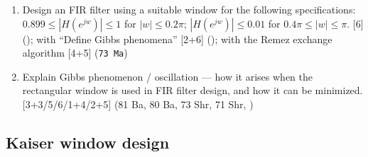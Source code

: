 \documentclass[12pt]{article}
\begin{document}
\begin{enumerate}[topsep=0pt, noitemsep]
      \item Design an FIR filter using a suitable window for the following specifications:
        $0.899\le|H(e^{jw})|\le1$ for $|w|\le0.2\pi$; \quad $|H(e^{jw})|\le0.01$ for $0.4\pi\le|w|\le\pi$.
        \hfill [6] (); with ``Define Gibbs phenomena'' \hfill [2+6] (); with the Remez exchange algorithm \hfill [4+5] (\texttt{73 Ma})

      \item Explain Gibbs phenomenon / oscillation --- how it arises when the rectangular window is used in FIR filter design, and how it can be minimized. \hfill [3+3/5/6/1+4/2+5] (81 Ba, 80 Ba, 73 Shr, 71 Shr, )
    \end{enumerate}

  \subsection{Kaiser window design}
\end{document}
